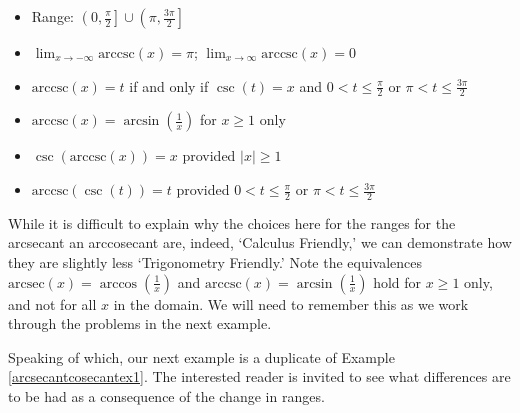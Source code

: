\documentclass{ximera}
\begin{document}
\begin{theorem}
\begin{itemize}
\begin{itemize}
\item Range: $\left(0, \frac{\pi}{2} \right] \cup \left( \pi, \frac{3\pi}{2} \right]$

\item  $\lim_{x \rightarrow -\infty} \text{arccsc}(x) =\pi$; $\lim_{x \rightarrow \infty} \text{arccsc}(x) =0$

\item  $\text{arccsc}(x) = t$ if and only if $\csc(t) = x$ and $0 < t \leq \frac{\pi}{2}$ or $\pi < t \leq \frac{3\pi}{2}$ 

\item  $\text{arccsc}(x) = \arcsin\left(\frac{1}{x}\right)$ for $x \geq 1$ only %

\item  $\csc\left(\text{arccsc}(x)\right) = x$ provided $|x| \geq 1$

\item  $\text{arccsc}(\csc(t)) = t$ provided $0 < t \leq \frac{\pi}{2}$ or $\pi < t \leq \frac{3\pi}{2}$

\end{itemize}

\end{itemize}

\end{theorem}


While it is difficult to explain why the choices here for the ranges for the arcsecant an arccosecant are, indeed, `Calculus Friendly,' we can demonstrate how they are slightly less `Trigonometry Friendly.'  Note the equivalences $\text{arcsec}(x) = \arccos\left(\frac{1}{x}\right)$ and $\text{arccsc}(x) = \arcsin\left(\frac{1}{x}\right)$  hold for $x \geq 1$ only, and not for all $x$ in the domain.  We will need to remember this as we work through the problems in the next example.

 

Speaking of which, our next example is a duplicate of Example \ref{arcsecantcosecantex1}.  The interested reader is invited to see what differences are to be had as a consequence of the change in ranges.
\end{document}
